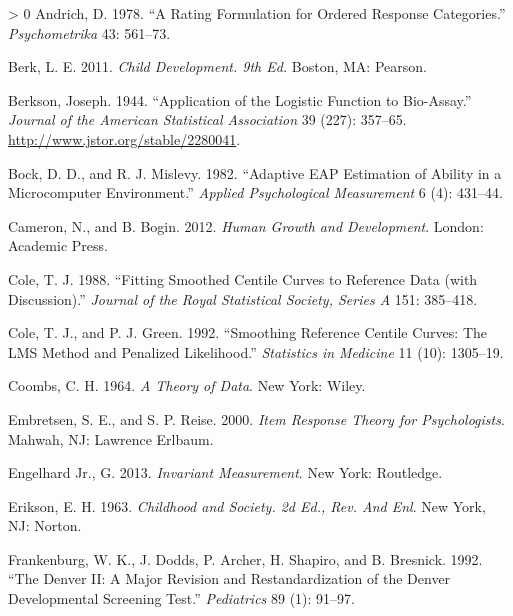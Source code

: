 \documentclass[
]{book}
\newlength{\cslhangindent}
\newenvironment{CSLReferences}[3] %
 {%
  \setlength{\parindent}{0pt}
  \ifodd #1 \everypar{\setlength{\hangindent}{\cslhangindent}}\ignorespaces\fi
  \ifnum #2 > 0
  \setlength{\parskip}{#2\baselineskip}
  \fi
 }%
 {}
\begin{document}
\hypertarget{refs}{}
\begin{CSLReferences}{1}{0}
\leavevmode\hypertarget{ref-andrich1978}{}%
Andrich, D. 1978. {``A Rating Formulation for Ordered Response Categories.''} \emph{Psychometrika} 43: 561--73.

\leavevmode\hypertarget{ref-berk2013}{}%
Berk, L. E. 2011. \emph{Child Development. 9th Ed.} Boston, MA: Pearson.

\leavevmode\hypertarget{ref-berkson1944}{}%
Berkson, Joseph. 1944. {``Application of the Logistic Function to Bio-Assay.''} \emph{Journal of the American Statistical Association} 39 (227): 357--65. \url{http://www.jstor.org/stable/2280041}.

\leavevmode\hypertarget{ref-bock1982}{}%
Bock, D. D., and R. J. Mislevy. 1982. {``Adaptive {EAP} Estimation of Ability in a Microcomputer Environment.''} \emph{Applied Psychological Measurement} 6 (4): 431--44.

\leavevmode\hypertarget{ref-cameron2012}{}%
Cameron, N., and B. Bogin. 2012. \emph{Human Growth and Development}. London: Academic Press.

\leavevmode\hypertarget{ref-cole1988}{}%
Cole, T. J. 1988. {``Fitting Smoothed Centile Curves to Reference Data (with Discussion).''} \emph{Journal of the Royal Statistical Society, Series A} 151: 385--418.

\leavevmode\hypertarget{ref-cole1992}{}%
Cole, T. J., and P. J. Green. 1992. {``Smoothing Reference Centile Curves: The {LMS} Method and Penalized Likelihood.''} \emph{Statistics in Medicine} 11 (10): 1305--19.

\leavevmode\hypertarget{ref-coombs1964}{}%
Coombs, C. H. 1964. \emph{A Theory of Data}. New York: Wiley.

\leavevmode\hypertarget{ref-embretsen2000}{}%
Embretsen, S. E., and S. P. Reise. 2000. \emph{Item Response Theory for Psychologists}. Mahwah, NJ: Lawrence Erlbaum.

\leavevmode\hypertarget{ref-engelhard2013}{}%
Engelhard Jr., G. 2013. \emph{Invariant Measurement}. New York: Routledge.

\leavevmode\hypertarget{ref-erikson1963}{}%
Erikson, E. H. 1963. \emph{Childhood and Society. 2d Ed., Rev. And Enl}. New York, NJ: Norton.

\leavevmode\hypertarget{ref-frankenburg1992}{}%
Frankenburg, W. K., J. Dodds, P. Archer, H. Shapiro, and B. Bresnick. 1992. {``The Denver II: A Major Revision and Restandardization of the Denver Developmental Screening Test.''} \emph{Pediatrics} 89 (1): 91--97.


\end{CSLReferences}
\end{document}
